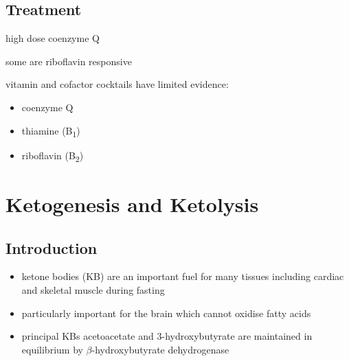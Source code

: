 \documentclass[12pt]{scrartcl}
\begin{document}
\subsection{Treatment}
\label{sec:org41fbdcd}
\begin{description}
\item[{Coenzyme Q disorders}] high dose coenzyme Q
\item[{CI deficiency}] some are riboflavin responsive
\item vitamin and cofactor cocktails have limited evidence:
\begin{itemize}
\item coenzyme Q
\item thiamine (B\textsubscript{1})
\item riboflavin (B\textsubscript{2})
\end{itemize}
\end{description}
\section{Ketogenesis and Ketolysis}
\label{sec:org7f704a8}
\subsection{Introduction}
\label{sec:orgd07f944}
\begin{itemize}
\item ketone bodies (KB) are an important fuel for many tissues including
cardiac and skeletal muscle during fasting
\item particularly important for the brain which cannot oxidise fatty
acids
\item principal KBs acetoacetate and 3-hydroxybutyrate are maintained in
equilibrium by \(\beta\)-hydroxybutyrate dehydrogenase

\end{itemize}

\begin{center}
\chemnameinit{}
\hspace{20}
\chemnameinit{}
\hspace{20}
\chemnameinit{}
\end{center}
\end{document}
